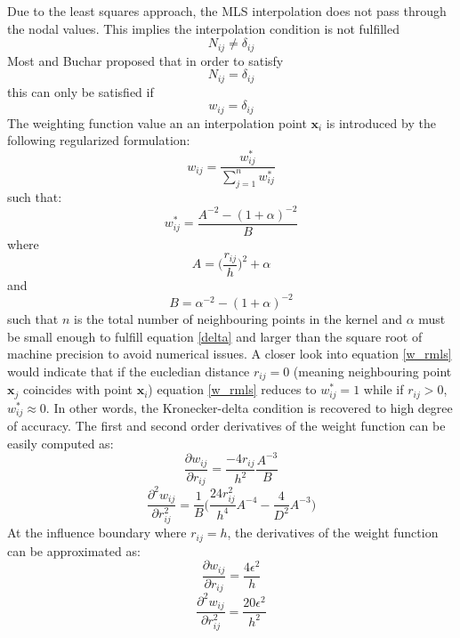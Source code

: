 \documentclass[12pt]{extarticle}
\begin{document}
\vspace{5 mm}
Due to the least squares approach, the MLS interpolation does not pass through the nodal values. This implies the interpolation condition is not fulfilled
\begin{equation}
N_{ij} \neq \delta_{ij}
\end{equation}
Most and Buchar proposed that in order to satisfy 
\begin{equation}
N_{ij} = \delta_{ij}
  \label{eq047}
\end{equation}
this can only be satisfied if
\begin{equation}
w_{ij} = \delta_{ij}
\label{delta}
\end{equation}
The weighting function value an an interpolation point $\textbf{x}_{i}$ is introduced by the following regularized formulation:
\begin{equation}
    w_{ij} = \frac{w_{ij}^{*}}{\sum_{j=1}^{n} w_{ij}^{*}}
  \label{eq049}
\end{equation}
such that:
\begin{equation}
w_{ij}^{*} = \frac{A^{-2} - (1 + \alpha)^{-2}}{B}
  \label{w_rmls}
\end{equation}
where 
\begin{equation}
    A = \Big(\frac{r_{ij}}{h}\Big)^{2} + \alpha
\end{equation}
and
\begin{equation}
B = \alpha^{-2} - (1 + \alpha)^{-2}
\end{equation}
such that $n$ is the total number of neighbouring points in the kernel and $\alpha$ must be small enough to fulfill equation \ref{delta} and larger than the square root of machine precision to avoid numerical issues. A closer look into equation \ref{w_rmls} would indicate that if the eucledian distance $r_{ij}=0$ (meaning neighbouring point $\textbf{x}_{j}$ coincides with point $\textbf{x}_i$) equation \ref{w_rmls} reduces to $w_{ij}^{*} = 1$ while if $r_{ij} > 0$, $w_{ij}^{*} \approx 0$. In other words, the Kronecker-delta condition is recovered to high degree of accuracy. The first and second order derivatives of the weight function can be easily computed as:
\begin{equation}
    \frac{\partial w_{ij}}{\partial r_{ij}} = \frac{-4 r_{ij}}{h^{2}} \frac{A^{-3}}{B}
\end{equation}
\begin{equation}
    \frac{\partial^{2} w_{ij}}{\partial r_{ij}^{2}} = \frac{1}{B} \Big( \frac{24 r_{ij}^2}{h^{4}} A^{-4} - \frac{4}{D^{2}} A^{-3} \Big)
\end{equation}
At the influence boundary where $r_{ij} = h$, the derivatives of the weight function can be approximated as:
\begin{equation}
    \frac{\partial w_{ij}}{\partial r_{ij}} = \frac{4 \epsilon^{2}}{h}
\end{equation}
\begin{equation}
    \frac{\partial^{2} w_{ij}}{\partial r_{ij}^{2}} = \frac{20 \epsilon^{2}}{h^{2}}
\end{equation}
\end{document}
